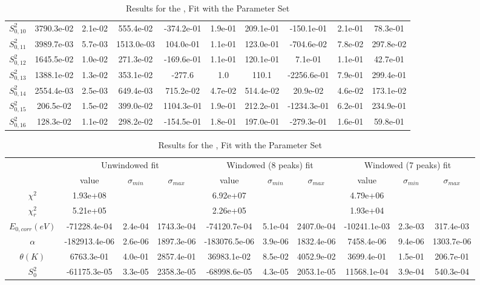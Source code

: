 \documentclass{article}
\begin{document}
\begin{landscape}
\begin{table}[ht]
\begin{tabular}{c|c|c|c|c|c|c|c|c|c}
$S^2_{0,10}$& 3790.3e-02 & 2.1e-02 & 555.4e-02 & -374.2e-01 & 1.9e-01 & 209.1e-01 & -150.1e-01 & 2.1e-01 & 78.3e-01 \\
$S^2_{0,11}$& 3989.7e-03 & 5.7e-03 & 1513.0e-03 & 104.0e-01 & 1.1e-01 & 123.0e-01 & -704.6e-02 & 7.8e-02 & 297.8e-02 \\
$S^2_{0,12}$& 1645.5e-02 & 1.0e-02 & 271.3e-02 & -169.6e-01 & 1.1e-01 & 120.1e-01 & 7.1e-01 & 1.1e-01 & 42.7e-01 \\
$S^2_{0,13}$& 1388.1e-02 & 1.3e-02 & 353.1e-02 & -277.6 & 1.0 & 110.1 & -2256.6e-01 & 7.9e-01 & 299.4e-01 \\
$S^2_{0,14}$& 2554.4e-03 & 2.5e-03 & 649.4e-03 & 715.2e-02 & 4.7e-02 & 514.4e-02 & 20.9e-02 & 4.6e-02 & 173.1e-02 \\
$S^2_{0,15}$& 206.5e-02 & 1.5e-02 & 399.0e-02 & 1104.3e-01 & 1.9e-01 & 212.2e-01 & -1234.3e-01 & 6.2e-01 & 234.9e-01 \\
$S^2_{0,16}$& 128.3e-02 & 1.1e-02 & 298.2e-02 & -154.5e-01 & 1.8e-01 & 197.0e-01 & -279.3e-01 & 1.6e-01 & 59.8e-01 \\
\hline
    \end{tabular}
    \caption{Results for the ,  Fit with the  Parameter Set}
\end{table}
\begin{table}[ht]
\centering
\begin{tabular}{c|c|c|c|c|c|c|c|c|c}
\hline
&\multicolumn{3}{|c}{Unwindowed fit}&\multicolumn{3}{|c}{Windowed (8 peaks) fit}&\multicolumn{3}{|c}{Windowed (7 peaks) fit}\\
& value & $\sigma_{min}$ & $\sigma_{max}$& value & $\sigma_{min}$ & $\sigma_{max}$& value & $\sigma_{min}$ & $\sigma_{max}$\\
\hline
$\chi^2$   & 1.93e+08 & & & 6.92e+07 & & & 4.79e+06 & & \\
$\chi^2_r$ & 5.21e+05 & & & 2.26e+05 & & & 1.93e+04 & & \\
\hline
$E_{0,corr} (eV)$& -71228.4e-04 & 2.4e-04 & 1743.3e-04 & -74120.7e-04 & 5.1e-04 & 2407.0e-04 & -10241.1e-03 & 2.3e-03 & 317.4e-03 \\
$\alpha $       & -182913.4e-06 & 2.6e-06 & 1897.3e-06 & -183076.5e-06 & 3.9e-06 & 1832.4e-06 & 7458.4e-06 & 9.4e-06 & 1303.7e-06 \\
$\theta (K) $   & 6763.3e-01 & 4.0e-01 & 2857.4e-01 & 36983.1e-02 & 8.5e-02 & 4052.9e-02 & 3699.4e-01 & 1.5e-01 & 206.7e-01 \\
$S^2_{0}$& -61175.3e-05 & 3.3e-05 & 2358.3e-05 & -68998.6e-05 & 4.3e-05 & 2053.1e-05 & 11568.1e-04 & 3.9e-04 & 540.3e-04 \\
\hline
    \end{tabular}
    \caption{Results for the ,  Fit with the  Parameter Set}
\end{table}
\end{landscape}
\end{document}
